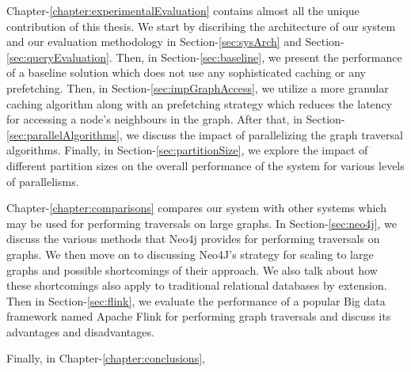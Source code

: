 \medskip
Chapter-\ref{chapter:experimentalEvaluation} contains almost all the unique
contribution of this thesis. We start by discribing the architecture of our
system and our evaluation methodology in Section-\ref{sec:sysArch} and 
Section-\ref{sec:queryEvaluation}. Then, in Section-\ref{sec:baseline}, we
present the performance of a baseline solution which does not use any
sophisticated caching or any prefetching. Then, in
Section-\ref{sec:impGraphAccess}, we utilize a more granular caching algorithm
along with an  prefetching strategy which reduces the latency for
accessing a node's neighbours in the graph. After that, in
Section-\ref{sec:parallelAlgorithms}, we discuss the impact of parallelizing the
graph traversal algorithms. Finally, in Section-\ref{sec:partitionSize}, we
explore the impact of different partition sizes on the overall performance of
the system for various levels of parallelisms.

\medskip
Chapter-\ref{chapter:comparisons} compares our system with other systems which
may be used for performing traversals on large graphs. In
Section-\ref{sec:neo4j}, we discuss the various methods that Neo4j provides for
performing traversals on graphs. We then move on to discussing Neo4J's strategy
for scaling to large graphs and possible shortcomings of their approach. We also
talk about how these shortcomings also apply to traditional relational databases
by extension. Then in Section-\ref{sec:flink}, we evaluate the performance of a
popular Big data framework named Apache Flink\cite{flink} for performing graph
traversals and discuss its advantages and disadvantages.

\medskip
Finally, in Chapter-\ref{chapter:conclusions},
